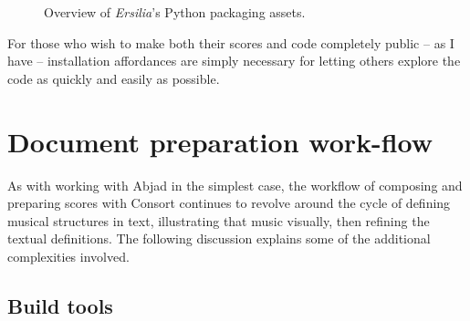\begin{figure}[h!]
\begin{singlespacing}
\vspace{-0.5\baselineskip}
\end{singlespacing}
\caption{Overview of \emph{Ersilia}'s Python packaging assets.}
\end{figure}

For those who wish to make both their scores and code completely public -- as I
have -- installation affordances are simply necessary for letting others
explore the code as quickly and easily as possible.

\section{Document preparation work-flow}
\label{sec:document-preparation-work-flow}

As with working with Abjad in the simplest case, the workflow of composing and
preparing scores with Consort continues to revolve around the cycle of defining
musical structures in text, illustrating that music visually, then refining the
textual definitions. The following discussion explains some of the additional
complexities involved.

\subsection{Build tools}
\label{ssec:build-tools}

